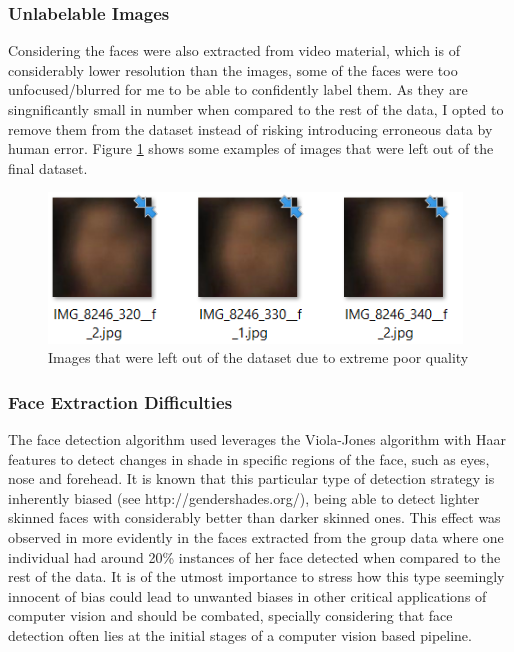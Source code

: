 \documentclass[11pt]{article}
\begin{document}
        \subsubsection{Unlabelable Images}
            Considering the faces were also extracted from video material, which is of considerably lower resolution than the images, some of the faces were too unfocused/blurred for me to be able to confidently label them. As they are singnificantly small in number when compared to the rest of the data, I opted to remove them from the dataset instead of risking introducing erroneous data by human error. Figure \ref{fig:label:blurry} shows some examples of images that were left out of the final dataset.
            \begin{figure}[ht]
                \centering
                \includegraphics[height=4cm]{./Images/labeling/blurry.png}
                \caption{Images that were left out of the dataset due to extreme poor quality}
                \label{fig:label:blurry}
            \end{figure}

        \subsubsection{Face Extraction Difficulties}
            The face detection algorithm used leverages the Viola-Jones algorithm with Haar features to detect changes in shade in specific regions of the face, such as eyes, nose and forehead. It is known that this particular type of detection strategy is inherently biased (see http://gendershades.org/), being able to detect lighter skinned faces with considerably better than darker skinned ones. This effect was observed in more evidently in the faces extracted from the group data where one individual had around 20\% instances of her face detected when compared to the rest of the data. It is of the utmost importance to stress how this type seemingly innocent of bias could lead to unwanted biases in other critical applications of computer vision and should be combated, specially considering that face detection often lies at the initial stages of a computer vision based pipeline.
\end{document}
